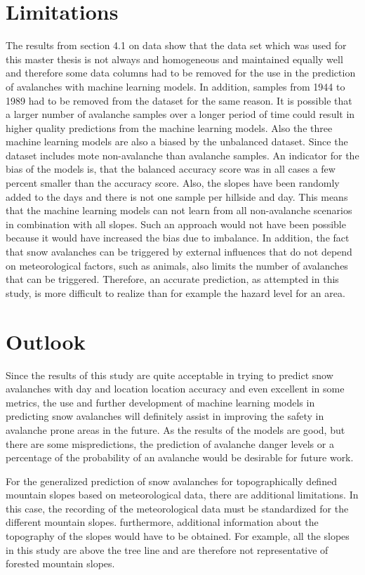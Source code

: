 \documentclass[../masterarbeit.tex]{subfiles}
\begin{document}
\section{Limitations}
The results from section 4.1 on data show that the data set which was used for this master thesis is not always and homogeneous and maintained equally well and therefore some data columns had to be removed for the use in the prediction of avalanches with machine learning models. In addition, samples from 1944 to 1989 had to be removed from the dataset for the same reason. It is possible that a larger number of avalanche samples over a longer period of time could result in higher quality predictions from the machine learning models.
Also the three machine learning models are also a biased by the unbalanced dataset. Since the dataset includes mote non-avalanche than avalanche samples. An indicator for the bias of the models is, that the balanced accuracy score was in all cases a few percent smaller than the accuracy score. Also, the slopes have been randomly added to the days and there is not one sample per hillside and day. This means that the machine learning models can not learn from all non-avalanche scenarios in combination with all slopes. Such an approach would not have been possible because it would have increased the bias due to imbalance.
In addition, the fact that snow avalanches can be triggered by external influences that do not depend on meteorological factors, such as animals, also limits the number of avalanches that can be triggered. Therefore, an accurate prediction, as attempted in this study, is more difficult to realize than for example the hazard level for an area.




\section{Outlook}

Since the results of this study are quite acceptable in trying to predict snow avalanches with day and location location accuracy and even excellent in some metrics, the use and further development of machine learning models in predicting snow avalanches will definitely assist in improving the safety in avalanche prone areas in the future. As the results of the models are good, but there are some mispredictions, the prediction of avalanche danger levels or a percentage of the probability of an avalanche would be desirable for future work.


For the generalized prediction of snow avalanches for topographically defined mountain slopes based on meteorological data, there are additional limitations. In this case, the recording of the meteorological data must be standardized for the different mountain slopes. furthermore, additional information about the topography of the slopes would have to be obtained.  For example, all the slopes in this study are above the tree line and are therefore not representative of forested mountain slopes.
\end{document}

